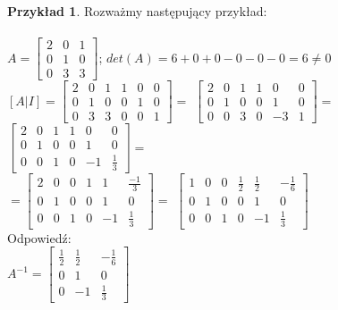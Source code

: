 \documentclass{article}
\theoremstyle{definition}
\theoremstyle{definition}
\theoremstyle{definition}
\newtheorem{pk}{Przykład}[subsection]
\theoremstyle{definition}
\begin{document}
\begin{pk}
    Rozważmy następujący przykład:\\\\
    $ A=\left[\begin{array}{ccc}
        2 & 0 & 1 \\
        0 & 1 & 0 \\
        0 & 3 & 3 
        \end{array}\right]  $;
    $ det (A) = 6+0+0-0-0-0=6\neq 0$\\
    $ [A|I]=\left[\begin{array}{ccc|ccc}
        2 & 0 & 1 & 1 & 0 & 0 \\
        0 & 1 & 0 & 0 & 1 & 0 \\
        0 & 3 & 3 & 0 & 0 & 1 
        \end{array}\right] =$
    $ \left[\begin{array}{ccc|ccc}
        2 & 0 & 1 & 1 & 0 & 0 \\
        0 & 1 & 0 & 0 & 1 & 0 \\
        0 & 0 & 3 & 0 & -3 & 1 
        \end{array}\right] =$
    $ \left[\begin{array}{ccc|ccc}
        2 & 0 & 1 & 1 & 0 & 0 \\
        0 & 1 & 0 & 0 & 1 & 0 \\
        0 & 0 & 1 & 0 & -1 & \frac{1}{3} 
        \end{array}\right] =$\\
    $ =\left[\begin{array}{ccc|ccc}
        2 & 0 & 0 & 1 & 1 & \frac{-1}{3} \\
        0 & 1 & 0 & 0 & 1 & 0 \\
        0 & 0 & 1 & 0 & -1 & \frac{1}{3} 
        \end{array}\right]  =$
    $ \left[\begin{array}{ccc|ccc}
        1 & 0 & 0 & \frac{1}{2} & \frac{1}{2} & -\frac{1}{6} \\
        0 & 1 & 0 & 0 & 1 & 0 \\
        0 & 0 & 1 & 0 & -1 & \frac{1}{3} 
        \end{array}\right]  $\\

    Odpowiedź:\\

    $ A^{-1}= \left[\begin{array}{ccc}
        \frac{1}{2} & \frac{1}{2} & -\frac{1}{6} \\
        0 & 1 & 0 \\
        0 & -1 & \frac{1}{3} 
        \end{array}\right]  $
    
\end{pk}
\end{document}
